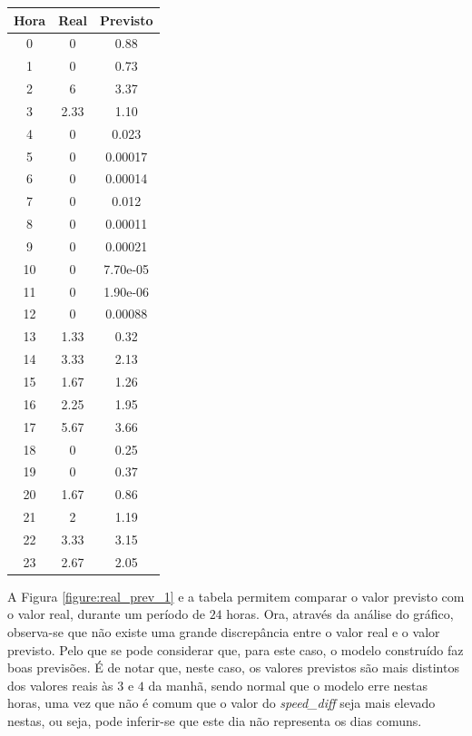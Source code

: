 \documentclass[a4paper, 12pt]{article}
\begin{document}
\begin{table}[H]
	\centering
	\begin{tabular}{||c||c|c||}
		\hline\hline
		Hora & Real&Previsto\\
		\hline\hline
		0 & 0
		&0.88 \\
		\hline
		1  &
		0 & 0.73\\
		\hline
		2 & 6 & 	3.37\\
		\hline
		3  & 
		2.33
		&1.10 \\
		\hline
		4 & 
		0 & 0.023\\
		\hline
		5  & 
		0 &0.00017 \\
		\hline
		6 & 
		0
		& 
		0.00014
		\\
		\hline
		7 & 0
		
		&0.012 \\
		\hline
		8  &0
		&0.00011 \\
		\hline
		9 &  0& 0.00021	\\
		\hline
		10 & 0
		
		& 7.70e-05\\
		\hline
		11  &0
		& 1.90e-06\\
		\hline
		12 &0  & 0.00088	\\
		\hline
		13  & 
		1.33
		&0.32 \\
		\hline
		14 & 
		3.33 &2.13\\
		\hline
		15  & 1.67
		& 1.26\\
		\hline
		16 & 
		2.25
		& 
		1.95
		\\
		\hline
		17 & 
		5.67
		& 3.66\\
		\hline
		18  &
		0 &0.25 \\
		\hline
		19 &  0& 0.37	\\
		\hline
		20 & 
		1.67
		&0.86 \\
		\hline
		21  &
		2 & 1.19\\
		\hline
		22 &  3.33& 3.15	\\
		\hline
		23  & 
		2.67 
		&2.05\\
		\hline\hline
	\end{tabular}
\end{table}

A Figura \ref{figure:real_prev_1} e a tabela permitem comparar o valor previsto com o valor real, durante um período de $24$ horas. Ora, através da análise do gráfico, observa-se que não existe uma grande discrepância entre o valor real e o valor previsto. Pelo que se pode considerar que, para este caso, o modelo construído faz boas previsões. É de notar que, neste caso, os valores previstos são mais distintos dos valores reais às $3$ e $4$ da manhã, sendo normal que o modelo erre nestas horas, uma vez que não é comum que o valor do \textit{speed\_diff} seja mais elevado nestas, ou seja, pode inferir-se que este dia não representa os dias comuns.
\end{document}
